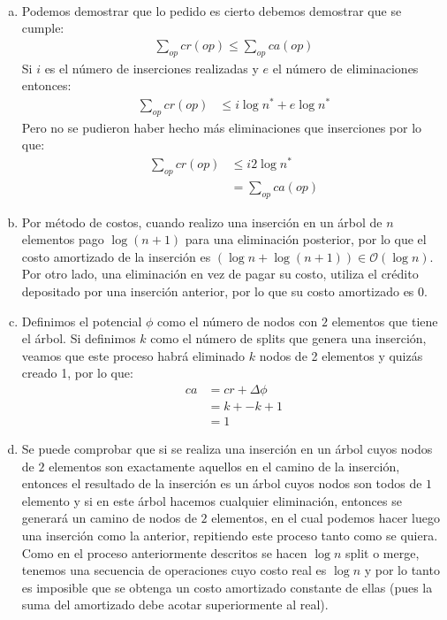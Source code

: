 \documentclass[dcc,uchile]{fcfmcourse}
\begin{document}
\begin{problems}
\\
\begin{enumerate}[a)]
    \item Podemos demostrar que lo pedido es cierto debemos demostrar que se cumple:
    \begin{align*}
        \sum_{op} cr(op) \le \sum_{op} ca(op)
    \end{align*}
    Si $i$ es el número de inserciones realizadas y $e$ el número de eliminaciones entonces:
    \begin{align*}
        \sum_{op} cr(op) & \le i\log n^* + e\log n^*
    \end{align*}
    Pero no se pudieron haber hecho más eliminaciones que inserciones por lo que:
    \begin{align*}
        \sum_{op} cr(op) &\le i2\log n^*\\
        &= \sum_{op} ca(op)
    \end{align*}
    \item Por método de costos, cuando realizo una inserción en un árbol de $n$ elementos pago $\log (n+1)$ para una eliminación posterior, por lo que el costo amortizado de la inserción es $(\log n + \log (n+1)) \in \mathcal{O}(\log n)$. Por otro lado, una eliminación en vez de pagar su costo, utiliza el crédito depositado por una inserción anterior, por lo que su costo amortizado es $0$.
    \item Definimos el potencial $\phi$ como el número de nodos con $2$ elementos que tiene el árbol. Si definimos $k$ como el número de splits que genera una inserción, veamos que este proceso habrá eliminado $k$ nodos de 2 elementos y quizás creado 1, por lo que:
    \begin{align*}
        ca &= cr + \Delta \phi\\
        &= k + -k + 1\\
        &= 1
    \end{align*}
    \item Se puede comprobar que si se realiza una inserción en un árbol cuyos nodos de $2$ elementos son exactamente aquellos en el camino de la inserción, entonces el resultado de la inserción es un árbol cuyos nodos son todos de $1$ elemento y si en este árbol hacemos cualquier eliminación, entonces se generará un camino de nodos de $2$ elementos, en el cual podemos hacer luego una inserción como la anterior, repitiendo este proceso tanto como se quiera. Como en el proceso anteriormente descritos se hacen $\log n$ split o merge, tenemos una secuencia de operaciones cuyo costo real es $\log n$ y por lo tanto es imposible que se obtenga un costo amortizado constante de ellas (pues la suma del amortizado debe acotar superiormente al real).

\end{enumerate}
\end{problems}
\end{document}
